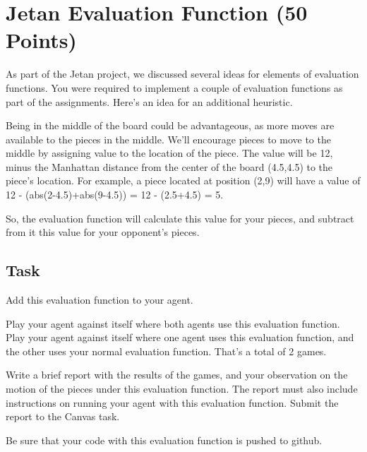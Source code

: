 \section*{Jetan Evaluation Function (50 Points)}

As part of the Jetan project, we discussed several
ideas for elements of evaluation functions.
You were required to implement a couple of
evaluation functions as part of the assignments.
Here's an idea for an additional heuristic.

Being in the middle of the board could be advantageous, as more moves
are available to the pieces in the middle.  We'll encourage pieces
to move to the middle by assigning value to the location of the
piece.  The value will be 12, minus the Manhattan distance
from the center of the board (4.5,4.5) to the piece's location.
For example,  a piece located at position (2,9) will have
a value of 12 - (abs(2-4.5)+abs(9-4.5)) = 12 - (2.5+4.5) = 5.

So, the evaluation function will calculate this value for your
pieces, and subtract from it this value for your opponent's pieces.
  
\subsection*{Task}

Add this evaluation function to your agent.

Play your agent against itself where both agents use this evaluation function.
Play your agent against itself where one agent uses this evaluation function,
and the other uses your normal evaluation function.  That's a total of 2 games.

Write a brief report with the results of the games, and your observation on the
motion of the pieces under this evaluation function. The report must
also include instructions on running your agent with this evaluation function.
Submit the report to the Canvas task.

Be sure that your code with this evaluation function is pushed to github.


